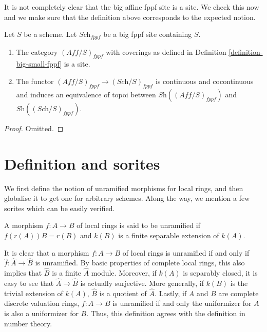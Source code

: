 \noindent
It is not completely clear that
the big affine fppf site is a site. We check this now
and we make sure that the definition above corresponds to
the expected notion.

\begin{lemma}
\label{lemma-verify-site-fppf}
Let $S$ be a scheme. Let $\textit{Sch}_{fppf}$ be a big fppf
site containing $S$.
\begin{enumerate}
\item The category $(\textit{Aff}/S)_{fppf}$ with coverings
as defined in Definition \ref{definition-big-small-fppf} is a site.
\item The functor $(\textit{Aff}/S)_{fppf} \to (\textit{Sch}/S)_{fppf}$
is continuous and cocontinuous and induces an equivalence of topoi
between
$\textit{Sh}((\textit{Aff}/S)_{fppf})$ and
$\textit{Sh}((\textit{Sch}/S)_{fppf})$.
\end{enumerate}
\end{lemma}

\begin{proof}
Omitted.
\end{proof}














\section{Definition and sorites}
\label{section-unramified-definition}

\noindent
We first define the notion of unramified morphisms for local rings, and then
globalise it to get one for arbitrary schemes. Along the way, we mention a few
sorites which can be easily verified.

\begin{definition}
\label{definition-unramified-rings}
A morphism $f:A \to B$ of local rings is said to be unramified if
$f(r(A))B = r(B)$ and $k(B)$ is a finite separable extension of $k(A)$. 
\end{definition}

\noindent
It is clear that a morphism $f:A \to B$ of local rings is unramified if and
only if $\widehat{f}:\widehat{A} \to \widehat{B}$ is unramified. By basic
properties of complete local rings, this also implies that $\widehat{B}$ is a
finite $\widehat{A}$ module. Moreover, if $k(A)$ is separably closed, it is
easy to see that $\widehat{A} \to \widehat{B}$ is actually surjective. More
generally, if $k(B)$ is the trivial extension of $k(A)$, $\widehat{B}$ is a
quotient of $\widehat{A}$. Lastly, if $A$ and $B$ are complete discrete
valuation rings, $f:A \to B$ is unramified if and only the uniformizer for
$A$ is also a uniformizer for $B$. Thus, this definition agrees with the
definition in number theory.

